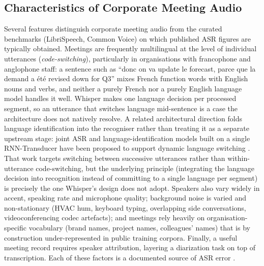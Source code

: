 \documentclass[12pt]{report}
\begin{document}
\subsection{Characteristics of Corporate Meeting Audio}
Several features distinguish corporate meeting audio from the curated benchmarks (LibriSpeech, Common Voice) on which published ASR figures are typically obtained. Meetings are frequently multilingual at the level of individual utterances (\textit{code-switching}), particularly in organisations with francophone and anglophone staff: a sentence such as \enquote{donc on va update le forecast, parce que la demand a été revised down for Q3} mixes French function words with English nouns and verbs, and neither a purely French nor a purely English language model handles it well. Whisper makes one language decision per processed segment, so an utterance that switches language mid-sentence is a case the architecture does not natively resolve. A related architectural direction folds language identification into the recogniser rather than treating it as a separate upstream stage: joint ASR and language-identification models built on a single RNN-Transducer have been proposed to support dynamic language switching \cite{punjabi2021joint}. That work targets switching between successive utterances rather than within-utterance code-switching, but the underlying principle (integrating the language decision into recognition instead of committing to a single language per segment) is precisely the one Whisper's design does not adopt. Speakers also vary widely in accent, speaking rate and microphone quality; background noise is varied and non-stationary (HVAC hum, keyboard typing, overlapping side conversations, videoconferencing codec artefacts); and meetings rely heavily on organisation-specific vocabulary (brand names, project names, colleagues' names) that is by construction under-represented in public training corpora. Finally, a useful meeting record requires speaker attribution, layering a diarization task on top of transcription. Each of these factors is a documented source of ASR error \cite{farahani2017autocorrelation,yoshioka2019advances}.
\end{document}
